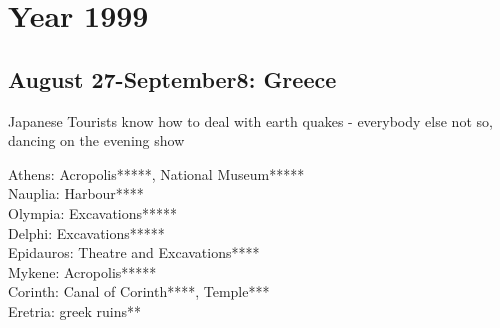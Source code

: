 \chapter{Year 1999}
\label{1999}

\section{August 27-September8: Greece}
\label{1999:Greece}


Japanese Tourists know how to deal with earth quakes - everybody else not so, dancing on the evening show

Athens: Acropolis*****, National Museum*****\\
Nauplia: Harbour****\\
Olympia: Excavations*****\\
Delphi: Excavations*****\\
 Epidauros: Theatre and Excavations****\\
 Mykene: Acropolis*****\\
 Corinth: Canal of Corinth****, Temple***\\
 Eretria: greek ruins**

